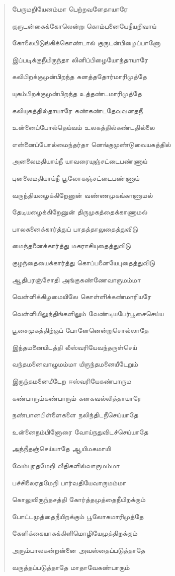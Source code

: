 \documentclass{article}
\begin{document}
\begin{quotation}
{பேருமறியேனம்மா பெற்றவளேதாயாரே

குருடன்கைக்கோலென்று கொம்பனையேநீயறிவாய்

கோலைபிடுங்கிக்கொண்டால் குருடன்பிழைப்பானோ

இப்படிக்குநீயிருந்தா லினிப்பிழையோந்தாயாரே

கலிபிறக்குமுன்பிறந்த கனத்ததோர்மாரிமுத்தே

யுகம்பிறக்குமுன்பிறந்த உத்தண்டமாரிமுத்தே

கலியுகத்தில்தாயாரே கண்கண்டதேவவனதநீ

உன்னைப்போல்தெய்வம் உலகத்தில்கண்டதில்லை

என்னைப்போல்மைந்தர்தா னெங்குமுண்டுவையகத்தில்

அனலைமதியாய்நீ யாவரையுஞ்சட்டைபண்ணாய்

புனலைமதியாய்நீ பூலோகஞ்சட்டைபண்ணாய்

வருந்தியழைக்கிறேனுன் வண்ணமுகங்காணாமல்

தேடியழைக்கிறேனுன்‌ திருமுகத்தைக்காணாமல்‌

பாலகனைக்கார்த்துப் பாதத்தாலுதைத்துவிடு

மைந்தனைக்கார்த்து மகராசியுதைத்துவிடு

குழந்தையைக்கார்த்து கொப்பனையேபுதைத்துவிடு

ஆதிபரஞ்சோதி அங்குகண்ணேவாருமம்மா

வெள்ளிக்கிழமையிலே கொள்ளிக்கண்மாரியரே

வெள்ளியிலுந்திங்களிலும் வேண்டியபேர்பூசைசெய்ய

பூசைமுகத்திற்குப் போனேனென்றுசொல்லாதே

இந்தமனையிடத்தி லீஸ்வரியேவந்தருள்செய்

வந்தமனைவாழுமம்மா யிருந்தமனையீடேறும்

இருந்தமனையீடேற ஈஸ்வரியேகண்பாரும

கண்பாரும்கண்பாரும் கனகவல்லித்தாயாரே

நண்பானபிள்ளைகளை நலிந்திடநீசெய்யாதே

உன்னைநம்பினோரை வோய்நதுவிடச்செய்யாதே

அந்நீதஞ்செய்யாதே ஆயிமகமாயி

வேம்புரதமேறி வீதிகளில்வாருமம்மா

பச்சிலைரதமேறி பார்வதியேவாருமம்மா

கொலுவிருந்தசத்தி கோர்த்தமுத்தைநீயிறக்கும்

போட்டமுத்தைநீயிறக்கும் பூலோகமாரிமுத்தே

கேளிக்கையாகக்கிளிமொழியேமுத்திறக்கும்

அரும்பாலகன்றன்னை அவஸ்தைப்படுத்தாதே

வருத்தப்படுத்தாதே மாதாவேகண்பாரும்

}
\end{quotation}
\end{document}
